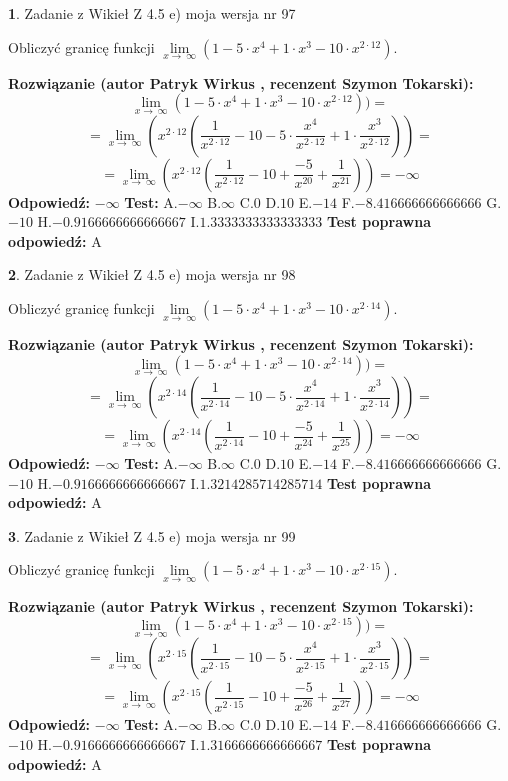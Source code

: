 \documentclass[12pt, a4paper]{article}
\theoremstyle{definition} %
\newtheorem{zad}{}
\newcommand{\zadStart}[1]{\begin{zad}#1\newline}
\newcommand{\zadStop}{\end{zad}}
\newcommand{\rozwStart}[2]{\noindent \textbf{Rozwiązanie (autor #1 , recenzent #2): }\newline}
\newcommand{\rozwStop}{\newline}
\newcommand{\odpStart}{\noindent \textbf{Odpowiedź:}\newline}
\newcommand{\odpStop}{\newline}
\newcommand{\testStart}{\noindent \textbf{Test:}\newline}
\newcommand{\testStop}{\newline}
\newcommand{\kluczStart}{\noindent \textbf{Test poprawna odpowiedź:}\newline}
\newcommand{\kluczStop}{\newline}
\begin{document}
\zadStart{Zadanie z Wikieł Z 4.5 e) moja wersja nr 97}


Obliczyć granicę funkcji  $\lim\limits_{x\to\ \infty}(1 - 5 \cdot x^{4}+1 \cdot x^{3}- 10 \cdot x^{2\cdot12})$.
\zadStop
\rozwStart{Patryk Wirkus}{Szymon Tokarski}
$$\lim\limits_{x\to\ \infty}(1 - 5 \cdot x^{4}+1 \cdot x^{3}- 10 \cdot x^{2\cdot12}))=$$
$$=\lim\limits_{x\to\ \infty}(x^{2\cdot12}(\frac{1}{x^{2\cdot12}}-10 -5 \cdot \frac{x^{4}}{x^{2\cdot12}}+1 \cdot \frac{x^{3}}{x^{2\cdot12}}))=$$
$$=\lim\limits_{x\to\ \infty}(x^{2\cdot12}(\frac{1}{x^{2\cdot12}}-10 + \frac{-5}{x^{20}}+ \frac{1}{x^{21}}))=-\infty$$
\rozwStop
\odpStart
$-\infty$
\odpStop
\testStart
A.$-\infty$ B.$\infty$ C.$0$ D.$10$ E.$-14$
F.$-8.416666666666666$ G.$-10$
H.$-0.9166666666666667$
I.$1.3333333333333333$
\testStop
\kluczStart
A
\kluczStop



\zadStart{Zadanie z Wikieł Z 4.5 e) moja wersja nr 98}


Obliczyć granicę funkcji  $\lim\limits_{x\to\ \infty}(1 - 5 \cdot x^{4}+1 \cdot x^{3}- 10 \cdot x^{2\cdot14})$.
\zadStop
\rozwStart{Patryk Wirkus}{Szymon Tokarski}
$$\lim\limits_{x\to\ \infty}(1 - 5 \cdot x^{4}+1 \cdot x^{3}- 10 \cdot x^{2\cdot14}))=$$
$$=\lim\limits_{x\to\ \infty}(x^{2\cdot14}(\frac{1}{x^{2\cdot14}}-10 -5 \cdot \frac{x^{4}}{x^{2\cdot14}}+1 \cdot \frac{x^{3}}{x^{2\cdot14}}))=$$
$$=\lim\limits_{x\to\ \infty}(x^{2\cdot14}(\frac{1}{x^{2\cdot14}}-10 + \frac{-5}{x^{24}}+ \frac{1}{x^{25}}))=-\infty$$
\rozwStop
\odpStart
$-\infty$
\odpStop
\testStart
A.$-\infty$ B.$\infty$ C.$0$ D.$10$ E.$-14$
F.$-8.416666666666666$ G.$-10$
H.$-0.9166666666666667$
I.$1.3214285714285714$
\testStop
\kluczStart
A
\kluczStop



\zadStart{Zadanie z Wikieł Z 4.5 e) moja wersja nr 99}


Obliczyć granicę funkcji  $\lim\limits_{x\to\ \infty}(1 - 5 \cdot x^{4}+1 \cdot x^{3}- 10 \cdot x^{2\cdot15})$.
\zadStop
\rozwStart{Patryk Wirkus}{Szymon Tokarski}
$$\lim\limits_{x\to\ \infty}(1 - 5 \cdot x^{4}+1 \cdot x^{3}- 10 \cdot x^{2\cdot15}))=$$
$$=\lim\limits_{x\to\ \infty}(x^{2\cdot15}(\frac{1}{x^{2\cdot15}}-10 -5 \cdot \frac{x^{4}}{x^{2\cdot15}}+1 \cdot \frac{x^{3}}{x^{2\cdot15}}))=$$
$$=\lim\limits_{x\to\ \infty}(x^{2\cdot15}(\frac{1}{x^{2\cdot15}}-10 + \frac{-5}{x^{26}}+ \frac{1}{x^{27}}))=-\infty$$
\rozwStop
\odpStart
$-\infty$
\odpStop
\testStart
A.$-\infty$ B.$\infty$ C.$0$ D.$10$ E.$-14$
F.$-8.416666666666666$ G.$-10$
H.$-0.9166666666666667$
I.$1.3166666666666667$
\testStop
\kluczStart
A
\kluczStop
\end{document}
